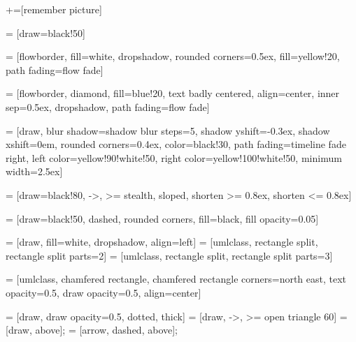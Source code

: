 +=[remember picture]

\newcommand\kernelred{black!20!red!100}


 = [draw=black!50]

 = [flowborder, fill=white, dropshadow,
                       rounded corners=0.5ex,
                       fill=yellow!20,
                       path fading=flow fade]

 = [flowborder, diamond, fill=blue!20,
                           text badly centered, align=center,
                           inner sep=0.5ex,
                           dropshadow, path fading=flow fade]


 = [draw,
                              blur shadow={shadow blur steps=5},
                              shadow yshift=-0.3ex, shadow xshift=0em,
                              rounded corners=0.4ex,
                              color=black!30,
                              path fading=timeline fade right,
                              left color=yellow!90!white!50,
                              right color=yellow!100!white!50,
                              minimum width=2.5ex]

 = [draw=black!80, ->, >= stealth, sloped,
                               shorten >= 0.8ex, shorten <= 0.8ex]

 = [draw=black!50, dashed,
                             rounded corners, fill=black, fill opacity=0.05]



  = [draw, fill=white, dropshadow, align=left]
 = [umlclass, rectangle split, rectangle split parts=2]
 = [umlclass, rectangle split, rectangle split parts=3]

 = [umlclass,
                       chamfered rectangle,
                       chamfered rectangle corners=north east,
                       text opacity=0.5, draw opacity=0.5, align=center]

 = [draw, draw opacity=0.5, dotted, thick]
 = [draw, ->, >= open triangle 60]
 = [draw, above];
 = [arrow, dashed, above];


